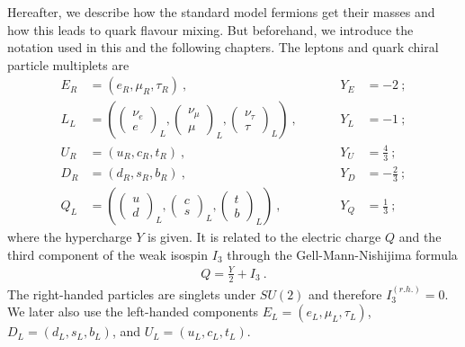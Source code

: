 Hereafter, we describe how the standard model fermions get their masses and how this leads to quark flavour mixing. But beforehand, we introduce the notation used in this and the following chapters. The leptons and quark chiral particle multiplets are
\begin{align}
	E_R &= (e_R,\mu_R,\tau_R) \ , &&\quad &Y_E &= -2 \ ; \\
	L_L &= \left(\begin{pmatrix} \nu_e \\ e \end{pmatrix}_L,
	\begin{pmatrix} \nu_\mu \\ \mu \end{pmatrix}_L,
	\begin{pmatrix} \nu_\tau \\ \tau \end{pmatrix}_L\right) \ , &&\quad &Y_L &= -1 \ ; \\
	U_R &= (u_R,c_R,t_R) \ , &&\quad &Y_U &= \frac{4}{3} \ ; \\
	D_R &= (d_R,s_R,b_R) \ , &&\quad &Y_D &= -\frac{2}{3} \ ; \\
	Q_L &= \left(\begin{pmatrix} u \\ d \end{pmatrix}_L,
	\begin{pmatrix} c \\ s \end{pmatrix}_L,
	\begin{pmatrix} t \\ b \end{pmatrix}_L\right) \ , &&\quad &Y_Q &= \frac{1}{3} \ ;
\end{align}
where the hypercharge $Y$ is given. It is related to the electric charge $Q$ and the third component of the weak isospin $I_3$ through the Gell-Mann-Nishijima formula \cite[Chapter 10.7]{Griffiths}
\begin{align}\label{eq:GellMann}
	Q = \frac{Y}{2} + I_3 \ .
\end{align}
The right-handed particles are singlets under $SU(2)$ and therefore $I^{(r.h.)}_3=0$. We later also use the left-handed components $E_L = (e_L,\mu_L,\tau_L)$, $D_L = (d_L,s_L,b_L)$, and $U_L = (u_L,c_L,t_L)$.


